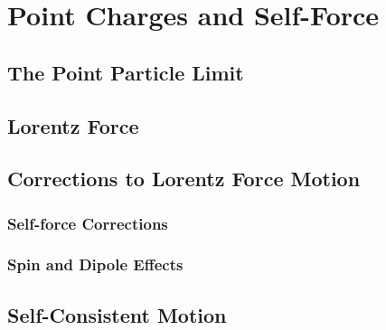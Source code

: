 \setcounter{chapter}{0}
\renewcommand{\thechapter}{10}
\chapter{Point Charges and Self-Force}
\setcounter{equation}{0}	        %

\section{The Point Particle Limit}

\section{Lorentz Force}

\section{Corrections to Lorentz Force Motion}

\subsection{Self-force Corrections}

\subsection{Spin and Dipole Effects}

\section{Self-Consistent Motion}



